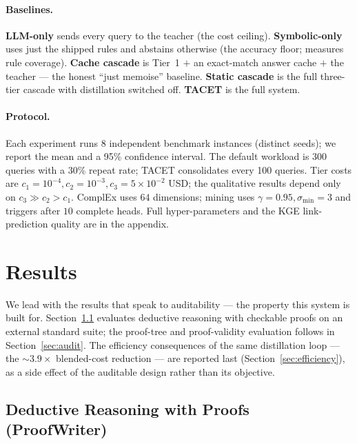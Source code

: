 \documentclass[11pt]{article}
\theoremstyle{plain}
\newcommand{\costFactor}{3.9}
\newcommand{\seeds}{8}
\renewcommand{\costFactor}{3.9}
\renewcommand{\seeds}{8}
\begin{document}
\paragraph{Baselines.} \textbf{LLM-only} sends every query to the teacher
(the cost ceiling). \textbf{Symbolic-only} uses just the shipped rules and
abstains otherwise (the accuracy floor; measures rule coverage).
\textbf{Cache cascade} is Tier~1 $+$ an exact-match answer cache $+$ the
teacher --- the honest ``just memoise'' baseline. \textbf{Static cascade}
is the full three-tier cascade with distillation switched off. \textbf{TACET}
is the full system.

\paragraph{Protocol.} Each experiment runs \seeds{} independent benchmark
instances (distinct seeds); we report the mean and a 95\% confidence
interval. The default workload is 300 queries with a 30\% repeat rate;
TACET consolidates every 100 queries. Tier costs are
$c_1{=}10^{-4},c_2{=}10^{-3},c_3{=}5{\times}10^{-2}$ USD; the qualitative
results depend only on $c_3\!\gg\!c_2\!>\!c_1$. ComplEx uses $64$
dimensions; mining uses $\gamma{=}0.95,\sigma_{\mathrm{min}}{=}3$ and triggers after $10$
complete heads. Full hyper-parameters and the KGE link-prediction quality
are in the appendix.

\section{Results}
\label{sec:results}

We lead with the results that speak to auditability --- the property this
system is built for. Section~\ref{sec:proofwriter} evaluates deductive
reasoning with checkable proofs on an external standard suite; the proof-tree
and proof-validity evaluation follows in Section~\ref{sec:audit}. The
efficiency consequences of the same distillation loop ---
the ${\sim}\costFactor\times$ blended-cost reduction --- are reported last
(Section~\ref{sec:efficiency}), as a side effect of the auditable design
rather than its objective.

\subsection{Deductive Reasoning with Proofs (ProofWriter)}
\label{sec:proofwriter}
\end{document}
